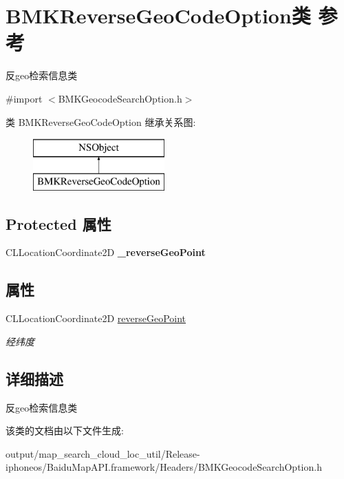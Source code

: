 \hypertarget{interface_b_m_k_reverse_geo_code_option}{}\section{B\+M\+K\+Reverse\+Geo\+Code\+Option类 参考}
\label{interface_b_m_k_reverse_geo_code_option}


反geo检索信息类  




{\ttfamily \#import $<$B\+M\+K\+Geocode\+Search\+Option.\+h$>$}

类 B\+M\+K\+Reverse\+Geo\+Code\+Option 继承关系图\+:\begin{figure}[H]
\begin{center}
\leavevmode
\includegraphics[height=2.000000cm]{interface_b_m_k_reverse_geo_code_option}
\end{center}
\end{figure}
\subsection*{Protected 属性}
\begin{DoxyCompactItemize}
\item 
\hypertarget{interface_b_m_k_reverse_geo_code_option_aa133954248beab4577dfab30a851741a}{}C\+L\+Location\+Coordinate2\+D {\bfseries \+\_\+reverse\+Geo\+Point}\label{interface_b_m_k_reverse_geo_code_option_aa133954248beab4577dfab30a851741a}

\end{DoxyCompactItemize}
\subsection*{属性}
\begin{DoxyCompactItemize}
\item 
\hypertarget{interface_b_m_k_reverse_geo_code_option_aaa7bef4496d51b86817745915fe5478e}{}C\+L\+Location\+Coordinate2\+D \hyperlink{interface_b_m_k_reverse_geo_code_option_aaa7bef4496d51b86817745915fe5478e}{reverse\+Geo\+Point}\label{interface_b_m_k_reverse_geo_code_option_aaa7bef4496d51b86817745915fe5478e}

\begin{DoxyCompactList}\small\item\em 经纬度 \end{DoxyCompactList}\end{DoxyCompactItemize}


\subsection{详细描述}
反geo检索信息类 

该类的文档由以下文件生成\+:\begin{DoxyCompactItemize}
\item 
output/map\+\_\+search\+\_\+cloud\+\_\+loc\+\_\+util/\+Release-\/iphoneos/\+Baidu\+Map\+A\+P\+I.\+framework/\+Headers/B\+M\+K\+Geocode\+Search\+Option.\+h\end{DoxyCompactItemize}
